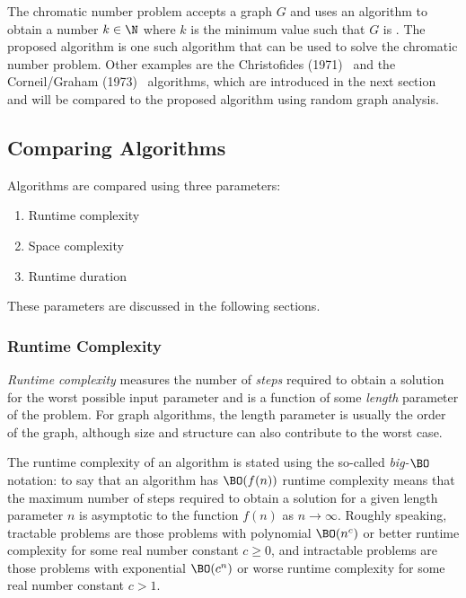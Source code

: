The chromatic number problem accepts a graph \(G\) and uses an algorithm to obtain a number \(k\in\N\) where \(k\)
is the minimum value such that \(G\) is .  The proposed algorithm is one such algorithm that can be
used to solve the chromatic number problem.  Other examples are the Christofides (1971)~\cite{christofides} and the
Corneil/Graham (1973)~\cite{corneil} algorithms, which are introduced in the next section and will be compared to
the proposed algorithm using random graph analysis.

\subsection{Comparing Algorithms}\label{sec:sub:compare}

Algorithms are compared using three parameters:
\begin{enumerate}
\item Runtime complexity
\item Space complexity
\item Runtime duration
\end{enumerate}

These parameters are discussed in the following sections.

\subsubsection{Runtime Complexity}\label{sec:sub:sub:runtime}

\emph{Runtime complexity} measures the number of \emph{steps} required to obtain a solution for the worst possible
input parameter and is a function of some \emph{length} parameter of the problem.  For graph algorithms, the length
parameter is usually the order of the graph, although size and structure can also contribute to the worst case.

The runtime complexity of an algorithm is stated using the so-called \emph{big-\(\BO\)} notation: to say that an
algorithm has \(\BO(f(n))\) runtime complexity means that the maximum number of steps required to obtain a solution
for a given length parameter \(n\) is asymptotic to the function \(f(n)\) as \(n\to\infty\).  Roughly speaking,
tractable problems are those problems with polynomial \(\BO(n^c)\) or better runtime complexity for some real
number constant \(c\ge0\), and intractable problems are those problems with exponential \(\BO(c^n)\) or worse
runtime complexity for some real number constant \(c>1\).

